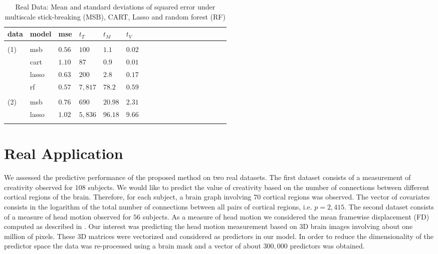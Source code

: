 \documentclass{article}
\begin{document}
\begin{table}[t]
\caption{Real Data: Mean and standard deviations of squared error under multiscale stick-breaking (MSB), CART, Lasso and random forest (RF)}\label{real} \vskip 0.15in \begin{center} \begin{small} \begin{sc}
\begin{tabular}{llllllllllllllllll}
\hline
\abovespace\belowspace
data  &model&mse&$t_{T}$ & $t_{M}$ & $t_{V}$\\
\hline
\\
(1)&msb &$0.56$ & $100$ & $1.1$& $0.02$\\
 & cart & $1.10$ & $87$ & $0.9$ &$0.01$\\
& lasso & $0.63$  & $200$ & $2.8$ & $0.17$\\
& rf & $0.57$ &  $7,817$ & $78.2$ & $0.59$\\
\\
(2)&msb &$0.76$ & $690$ & $20.98$& $2.31$\\
 & lasso & $1.02$  & $5,836$ & $96.18$ & $9.66$\\
\\
\hline

\end{tabular}
\end{sc}
\end{small}
\end{center}
\vskip -0.1in
\end{table}

\section{Real Application}

We assessed the predictive performance of the proposed method on two real datasets. The first dataset consists of a measurement of creativity observed for $108$ subjects. We would like to predict the value of creativity based on the number of connections between different cortical regions of the brain. Therefore, for each subject, a brain graph involving $70$ cortical regions was observed. The vector of covariates consists in the logarithm of the total number of connections between all pairs of cortical regions, i.e. $p=2,415$. The second dataset consists of a measure of head motion observed for $56$ subjects. As a measure of head motion we considered the mean framewise displacement (FD) computed as described in \cite{Power}. Our interest was predicting the head motion measurement based on $3$D brain images involving about one million of pixels. These $3$D matrices were vectorized and considered as predictors in our model. In order to reduce the dimensionality of the predictor space the data was re-processed using a brain mask and a vector of about $300,000$ predictors  was obtained.
\end{document}
